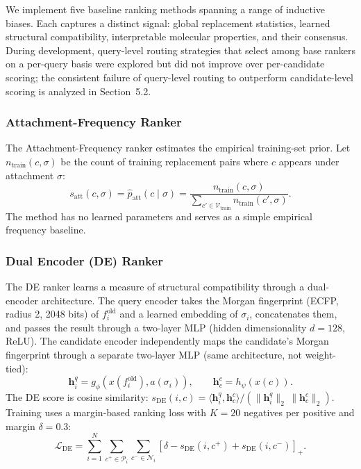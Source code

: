 \documentclass[12pt,letterpaper]{article}
\begin{document}
We implement five baseline ranking methods spanning a range of inductive biases. Each captures a distinct signal: global replacement statistics, learned structural compatibility, interpretable molecular properties, and their consensus. During development, query-level routing strategies that select among base rankers on a per-query basis were explored but did not improve over per-candidate scoring; the consistent failure of query-level routing to outperform candidate-level scoring is analyzed in Section~5.2.

\subsubsection{Attachment-Frequency Ranker}

The Attachment-Frequency ranker estimates the empirical training-set prior. Let $n_{\mathrm{train}}(c,\sigma)$ be the count of training replacement pairs where $c$ appears under attachment $\sigma$:
%
\begin{equation}
s_{\mathrm{att}}(c,\sigma) = \widehat{p}_{\mathrm{att}}(c\mid\sigma) = \frac{n_{\mathrm{train}}(c,\sigma)}{\sum_{c'\in\mathcal{V}_{\mathrm{train}}} n_{\mathrm{train}}(c',\sigma)}.
\end{equation}
%
The method has no learned parameters and serves as a simple empirical frequency baseline.

\subsubsection{Dual Encoder (DE) Ranker}

The DE ranker learns a measure of structural compatibility through a dual-encoder architecture. The query encoder takes the Morgan fingerprint (ECFP, radius 2, 2048 bits) of $f_i^{\mathrm{old}}$ and a learned embedding of $\sigma_i$, concatenates them, and passes the result through a two-layer MLP (hidden dimensionality $d=128$, ReLU). The candidate encoder independently maps the candidate's Morgan fingerprint through a separate two-layer MLP (same architecture, not weight-tied):
%
\begin{equation}
\mathbf{h}^{q}_{i} = g_{\phi}\!\left(x(f_i^{\mathrm{old}}),a(\sigma_i)\right), \qquad \mathbf{h}^{c}_{c} = h_{\psi}\!\left(x(c)\right).
\end{equation}
%
The DE score is cosine similarity: $s_{\mathrm{DE}}(i,c) = \langle \mathbf{h}^{q}_{i},\mathbf{h}^{c}_{c}\rangle / (\lVert\mathbf{h}^{q}_{i}\rVert_2\,\lVert\mathbf{h}^{c}_{c}\rVert_2)$. Training uses a margin-based ranking loss with $K=20$ negatives per positive and margin $\delta=0.3$:
%
\begin{equation}
\mathcal{L}_{\mathrm{DE}} = \sum_{i=1}^{N} \sum_{c^{+}\in\mathcal{P}_i} \sum_{c^{-}\in\mathcal{N}_i} \left[\delta - s_{\mathrm{DE}}(i,c^{+}) + s_{\mathrm{DE}}(i,c^{-})\right]_{+}.
\end{equation}
\end{document}
